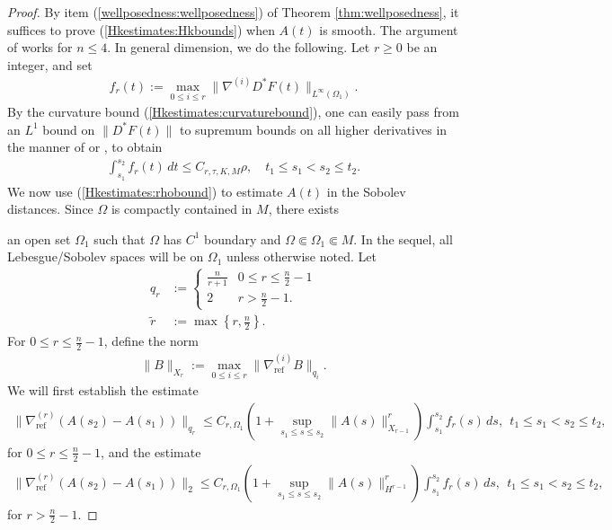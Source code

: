 \documentclass[12pt]{amsart}
\renewcommand{\1}{{\mathbf 1}}
\theoremstyle{others}
\numberwithin{equation}{section}
\begin{document}
\begin{proof}
By item (\ref{wellposedness:wellposedness}) of Theorem \ref{thm:wellposedness}, it suffices to prove (\ref{Hkestimates:Hkbounds}) when \(A(t)\) is smooth. The argument of \cite[Prop. 3.3]{instantons} works for \(n \leq 4\). In general dimension, we do the following. Let \(r \geq 0\) be an integer, and set
\begin{align*}
    f_r(t) := \max_{0 \leq i \leq r} \|\nabla^{(i)} D^\ast F(t)\|_{L^\infty(\Omega_1)}.
\end{align*} By the curvature bound (\ref{Hkestimates:curvaturebound}), one can easily pass from an $L^1$ bound on $\| D^*F(t) \|$ to supremum bounds on all higher derivatives in the manner of \cite[Prop. 3.2]{instantons} or \cite[Lemma 2.2]{waldronuhlenbeck}, to obtain
\begin{align}\label{Hkestimates:rhobound}
    \int_{s_1}^{s_2} f_r(t) \, dt \leq C_{r, \tau, K, M} \rho, \quad t_1 \leq s_1 < s_2 \leq t_2.
\end{align}
We now use (\ref{Hkestimates:rhobound}) to estimate $A(t)$ in the Sobolev distances. Since \(\Omega\) is compactly contained in \(M\), there exists 

an open set \(\Omega_1\) such that \(\Omega\) has \(C^1\) boundary and \(\Omega \Subset \Omega_1 \Subset M\). In the sequel, all Lebesgue/Sobolev spaces will be on \(\Omega_1\) unless otherwise noted. Let
     \begin{align*}
         q_r &:=
         \begin{cases}
             \frac{n}{r+1} & 0 \leq r \leq \frac{n}{2}-1 \\
             2 & r > \frac{n}{2}-1.
         \end{cases} \\
        \tilde{r} &:= \max\left\{r, \frac{n}{2}\right\}.
     \end{align*}
For \(0 \leq r \leq \frac{n}{2}-1\), define the norm
    \begin{align*}
        \|B\|_{X_r} := \max_{0 \leq i \leq r} \|\nabla_{\text{ref}}^{(i)} B\|_{q_i}.
    \end{align*}
    We will first establish the estimate
    \begin{align}\label{Hkestimates:lowinductionestimate}
        \|\nabla_{\text{ref}}^{(r)}(A(s_2) - A(s_1))\|_{q_r} \leq C_{r, \Omega_1} \left( 1 + \sup_{s_1 \leq s \leq s_2} \|A(s)\|_{X_{r-1}}^r \right) \int_{s_1}^{s_2} f_r(s) \, ds, \ \ t_1 \leq s_1 < s_2 \leq t_2,
    \end{align}
    for \(0 \leq r \leq \frac{n}{2}-1\), and the estimate
    \begin{align}\label{Hkestimates:highinductionestimate}
        \|\nabla_{\text{ref}}^{(r)}(A(s_2) - A(s_1))\|_2 \leq C_{r, \Omega_1} \left(1 + \sup_{s_1 \leq s \leq s_2} \|A(s)\|_{H^{r-1}}^r \right) \int_{s_1}^{s_2} f_r(s) \, ds, \ \  t_1 \leq s_1 < s_2 \leq t_2,
    \end{align} for \(r > \frac{n}{2}-1\).
    

\end{proof}
\end{document}
